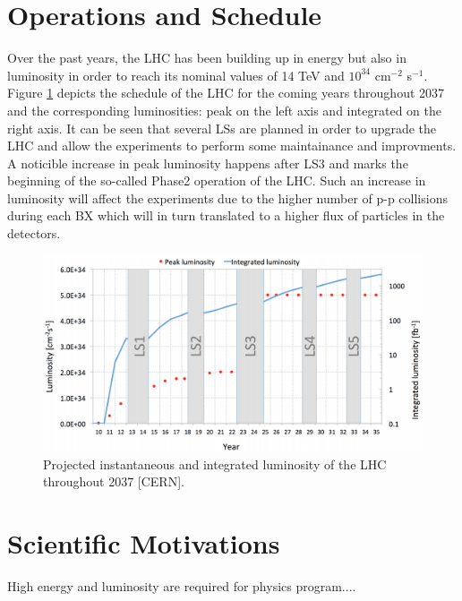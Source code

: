	\section{Operations and Schedule}

    Over the past years, the LHC has been building up in energy but also in luminosity in order to reach its nominal values of 14 TeV and $ 10^{34} $ cm$^{-2}$ s$^{-1}$. Figure \ref{fig:I-2-luminosity} depicts the schedule of the LHC for the coming years throughout 2037 and the corresponding luminosities: peak on the left axis and integrated on the right axis. It can be seen that several LSs are planned in order to upgrade the LHC and allow the experiments to perform some maintainance and improvments. A noticible increase in peak luminosity happens after LS3 and marks the beginning of the so-called Phase2 operation of the LHC. Such an increase in luminosity will affect the experiments due to the higher number of p-p collisions during each BX which will in turn translated to a higher flux of particles in the detectors. \\

    \begin{figure}[h!]
      \centering
      \includegraphics[width=\textwidth]{img/I-2-LHC/lhc-schedule.png}
      \caption{Projected instantaneous and integrated luminosity of the LHC throughout 2037 [CERN].}
      \label{fig:I-2-luminosity}
    \end{figure}

  \section{Scientific Motivations}

    High energy and luminosity are required for physics program....
